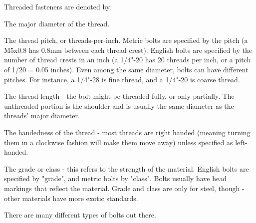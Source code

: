 \documentclass[10pt,letterpaper]{book}
\begin{document}
	Threaded fasteners are denoted by:
	\begin{asparaitem}
		\item The major diameter of the thread.
		\item The thread pitch, or threads-per-inch. Metric bolts are specified by the pitch (a M5x0.8 has 0.8mm between each thread crest). English bolts are specified by the number of thread crests in an inch (a 1/4"-20 has 20 threads per inch, or a pitch of 1/20 = 0.05 inches). Even among the same diameter, bolts can have different pitches. For instance, a 1/4"-28 is fine thread, and a 1/4"-20 is coarse thread.
		\item The thread length - the bolt might be threaded fully, or only partially. The unthreaded portion is the shoulder and is usually the same diameter as the threads' major diameter.
		\item The handedness of the thread - most threads are right handed (meaning turning them in a clockwise fashion will make them move away) unless specified as left-handed.
		\item The grade or class - this refers to the strength of the material. English bolts are specified by "grade", and metric bolts by "class". Bolts usually have head markings that reflect the material. Grade and class are only for steel, though - other materials have more exotic standards.
	\end{asparaitem}
	
	There are many different types of bolts out there.
	
\end{document}
